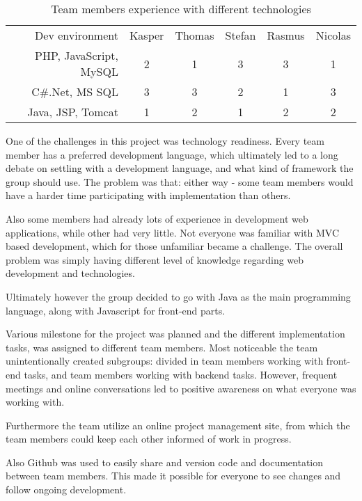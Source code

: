 \begin{table}[h]
\caption{Team members experience with different technologies}\label{tbl:dev_environment}
    \begin{tabular}{rccccc}
    Dev environment        & Kasper & Thomas & Stefan & Rasmus & Nicolas \\
    PHP, JavaScript, MySQL & 2      & 1      & 3      & 3      & 1       \\
    C\#.Net, MS SQL         & 3      & 3      & 2      & 1      & 3       \\
    Java, JSP, Tomcat      & 1      & 2      & 1      & 2      & 2       \\
    \end{tabular}
\end{table}

One of the challenges in this project was technology readiness. Every team member has a preferred development language, which ultimately led to a long debate on settling with a development language, and what kind of framework the group should use.
The problem was that: either way - some team members would have a harder time participating with implementation than others.

Also some members had already lots of experience in development web applications, while other had very little. Not everyone was familiar with MVC based development, which for those unfamiliar became a challenge. The overall problem was simply having different level of knowledge regarding web development and technologies.

Ultimately however the group decided to go with Java as the main programming language, along with Javascript for front-end parts.

Various milestone for the project was planned and the different implementation tasks, was assigned to different team members. Most noticeable the team unintentionally created subgroups: divided in team members working with front-end tasks, and team members working with backend tasks.
However, frequent meetings and online conversations led to positive awareness on what everyone was working with.

Furthermore the team utilize an online project management site, from which the team members could keep each other informed of work in progress.

Also Github was used to easily share and version code and documentation between team members. This made it possible for everyone to see changes and follow ongoing development.
